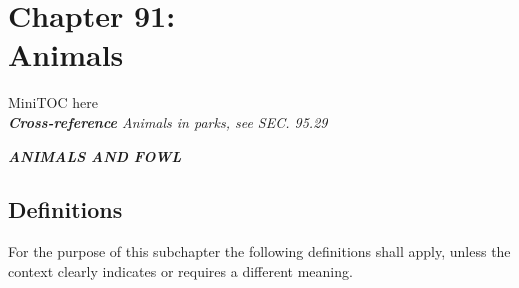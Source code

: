 %
\chapter*{Chapter 91: \\
	Animals}

MiniTOC here\\
\emph{\textbf{Cross-reference} Animals in parks, see SEC. 95.29}
\pagebreak


\begin{center}
\emph{\textbf{\LARGE{ANIMALS AND FOWL}}}
\end{center}

\section{Definitions}
For the purpose of this subchapter the following definitions shall apply, unless the context clearly indicates or requires a different meaning.
